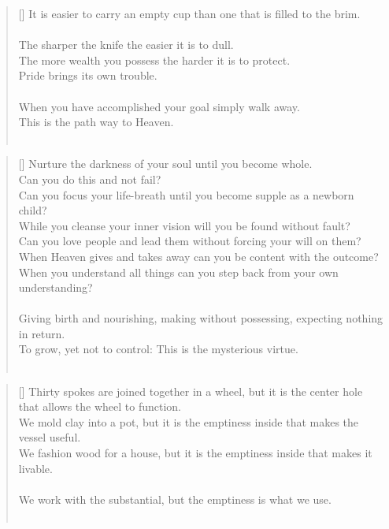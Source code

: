 \documentclass{article}
\begin{document}
\settowidth{\versewidth}{The Wizard leads byemptying people’s minds, filling their bellies, weakening their am- bitions, and making them become strong}
\begin{verse}[\versewidth]
It is easier to carry an empty cup than one that is filled to the brim.\\
\hfill\\
The sharper the knife the easier it is to dull.\\
The more wealth you possess the harder it is to protect.\\
Pride brings its own trouble.\\
\hfill\\
When you have accomplished your goal simply walk away.\\
This is the path way to Heaven.\\
\hfill\\
\end{verse}

\settowidth{\versewidth}{The Wizard leads byemptying people’s minds, filling their bellies, weakening their am- bitions, and making them become strong}
\begin{verse}[\versewidth]
Nurture the darkness of your soul until you become whole.\\
Can you do this and not fail?\\
Can you focus your life-breath until you become supple as a newborn child?\\
While you cleanse your inner vision will you be found without fault?\\
Can you love people and lead them without forcing your will on them?\\
When Heaven gives and takes away can you be content with the outcome?\\
When you understand all things can you step back from your own understanding?\\
\hfill\\
Giving birth and nourishing, making without possessing, expecting nothing in return.\\
To grow, yet not to control: This is the mysterious virtue.\\
\hfill\\
\end{verse}

\settowidth{\versewidth}{The Wizard leads byemptying people’s minds, filling their bellies, weakening their am- bitions, and making them become strong}
\begin{verse}[\versewidth]
Thirty spokes are joined together in a wheel, but it is the center hole that allows the wheel to function.\\
We mold clay into a pot, but it is the emptiness inside that makes the vessel useful.\\
We fashion wood for a house, but it is the emptiness inside that makes it livable.\\
\hfill\\
We work with the substantial, but the emptiness is what we use.\\
\hfill\\
\end{verse}
\end{document}
